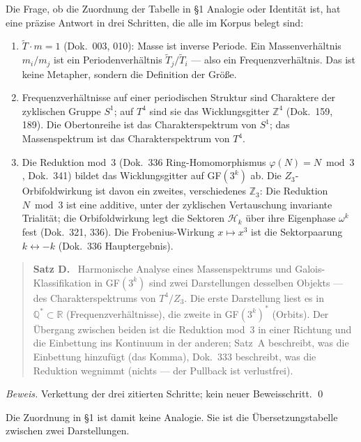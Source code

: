 Die Frage, ob die Zuordnung der Tabelle in §1 Analogie oder Identität ist,
hat eine präzise Antwort in drei Schritten, die alle im Korpus belegt sind:

\begin{enumerate}
\item $\tilde{T}\cdot m=1$ (Dok.~003, 010): Masse ist inverse Periode.
  Ein Massenverhältnis $m_i/m_j$ ist ein Periodenverhältnis
  $\tilde{T}_j/\tilde{T}_i$ --- also ein Frequenzverhältnis. Das ist keine
  Metapher, sondern die Definition der Größe.
\item Frequenzverhältnisse auf einer periodischen Struktur sind
  Charaktere der zyklischen Gruppe $S^1$; auf $T^4$ sind sie das
  Wicklungsgitter $\mathbb{Z}^4$ (Dok.~159, 189). Die Obertonreihe ist
  das Charakterspektrum von $S^1$; das Massenspektrum ist das
  Charakterspektrum von $T^4$.
\item Die Reduktion mod~3 (Dok.~336 Ring-Homomorphismus
  $\varphi(N)=N\bmod3$, Dok.~341) bildet das Wicklungsgitter auf
  GF$(3^k)$ ab. Die $Z_3$-Orbifoldwirkung ist davon ein zweites,
  verschiedenes $\mathbb{Z}_3$: Die Reduktion $N\bmod 3$ ist eine additive,
  unter der zyklischen Vertauschung invariante Trialität; die
  Orbifoldwirkung legt die Sektoren $\mathcal H_k$ über ihre Eigenphase
  $\omega^k$ fest (Dok.~321, 336). Die Frobenius-Wirkung $x\mapsto x^3$
  ist die Sektorpaarung $k\leftrightarrow-k$ (Dok.~336 Hauptergebnis).
\end{enumerate}

\begin{quote}
\textbf{Satz D.} \BM\ Harmonische Analyse eines Massenspektrums und
Galois-Klassifikation in GF$(3^k)$ sind zwei Darstellungen desselben
Objekts --- des Charakterspektrums von $T^4/Z_3$. Die erste Darstellung
liest es in $\mathbb{Q}^*\subset\mathbb{R}$ (Frequenzverhältnisse), die
zweite in GF$(3^k)^*$ (Orbits). Der Übergang zwischen beiden ist die
Reduktion mod~3 in einer Richtung und die Einbettung ins Kontinuum in
der anderen; Satz~A beschreibt, was die Einbettung hinzufügt (das Komma),
Dok.~333 beschreibt, was die Reduktion wegnimmt (nichts --- der Pullback
ist verlustfrei).
\end{quote}

\emph{Beweis.} Verkettung der drei zitierten Schritte; kein neuer
Beweisschritt. \qed

Die Zuordnung in §1 ist damit keine Analogie. Sie ist die Übersetzungstabelle
zwischen zwei Darstellungen.


